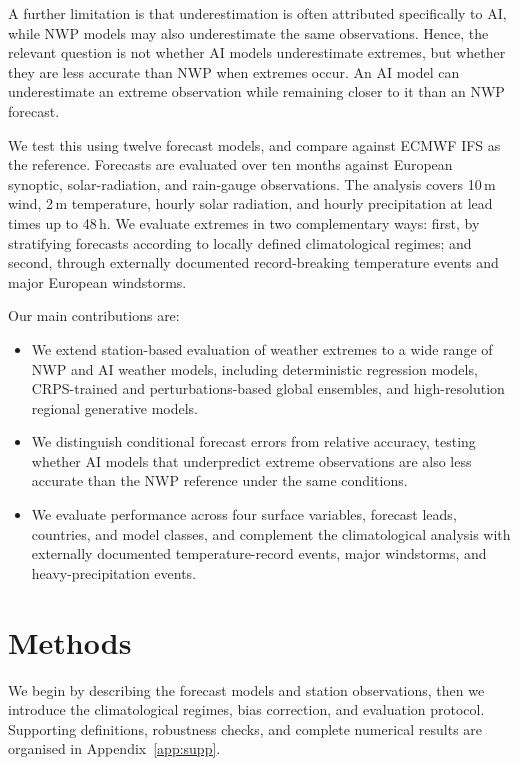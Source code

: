 \documentclass{article}
\begin{document}
A further limitation is that underestimation is often attributed specifically
to AI, while NWP models may also underestimate the same observations.  Hence, the relevant question is not whether AI
models underestimate extremes, but whether they are less accurate than NWP
when extremes occur. An
AI model can underestimate an extreme observation while remaining
closer to it than an NWP forecast.

We test this using twelve forecast models, and compare against ECMWF IFS as the
reference. Forecasts are evaluated over ten months against European
synoptic, solar-radiation, and rain-gauge observations. The analysis covers
10\,m wind, 2\,m temperature, hourly solar radiation, and hourly
precipitation at lead times up to 48\,h. We evaluate extremes in two
complementary ways: first, by stratifying forecasts according to locally
defined climatological regimes; and second, through externally documented
record-breaking temperature events and major European windstorms.

Our main contributions are:

\begin{itemize}

\item We extend station-based evaluation of weather extremes to
a wide range of NWP and AI weather models, including deterministic regression models, CRPS-trained and perturbations-based global ensembles, and
high-resolution regional generative models.

\item We distinguish conditional forecast errors from relative accuracy,
testing whether AI models that underpredict extreme observations are also
less accurate than the NWP reference under the same conditions.

\item We evaluate performance across four surface variables, forecast
leads, countries, and model classes, and complement the climatological
analysis with externally documented temperature-record events, major
windstorms, and heavy-precipitation events.

\end{itemize}
\section{Methods}
\label{sec:data}

We begin by describing the forecast models and station observations, then we introduce the
climatological regimes, bias correction, and evaluation protocol.
Supporting definitions, robustness checks, and complete numerical results
are organised in Appendix~\ref{app:supp}.
\end{document}
